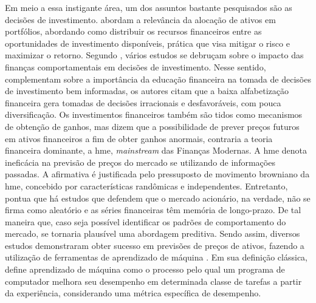 Em meio a essa instigante área, um dos assuntos bastante pesquisados são as decisões de investimento.  abordam a relevância da alocação de ativos em portfólios, abordando como distribuir os recursos financeiros entre as oportunidades de investimento disponíveis, prática que visa mitigar o risco e maximizar o retorno. Segundo , vários estudos se debruçam sobre o impacto das finanças comportamentais em decisões de investimento. Nesse sentido,  complementam sobre a importância da educação financeira na tomada de decisões de investimento bem informadas, os autores citam que a baixa alfabetização financeira gera tomadas de decisões irracionais e desfavoráveis, com pouca diversificação. Os investimentos financeiros também são tidos como mecanismos de obtenção de ganhos, mas  dizem que a possibilidade de prever preços futuros em ativos financeiros a fim de obter ganhos anormais, contraria a teoria financeira dominante, a \ac{hme}, \textit{mainstream} das Finanças Modernas. A \acs{hme} denota ineficácia na previsão de preços do mercado se utilizando de informações passadas. A afirmativa é justificada pelo pressuposto de movimento browniano da \acs{hme}, concebido por características randômicas e independentes. Entretanto,  pontua que há estudos que defendem que o mercado acionário, na verdade, não se firma como aleatório e as séries financeiras têm memória de longo-prazo. De tal maneira que, caso seja possível identificar os padrões de comportamento do mercado, se tornaria plausível uma abordagem preditiva. Sendo assim, diversos estudos demonstraram obter sucesso em previsões de preços de ativos, fazendo a utilização de ferramentas de aprendizado de máquina \cite{livieris2020ensemble,derbentsev2021comparative,hamayel2021novel,chaweewanchon2022markowitz,park2023intelligent}. Em sua definição clássica,  define aprendizado de máquina como o processo pelo qual um programa de computador melhora seu desempenho em determinada classe de tarefas a partir da experiência, considerando uma métrica específica de desempenho.

